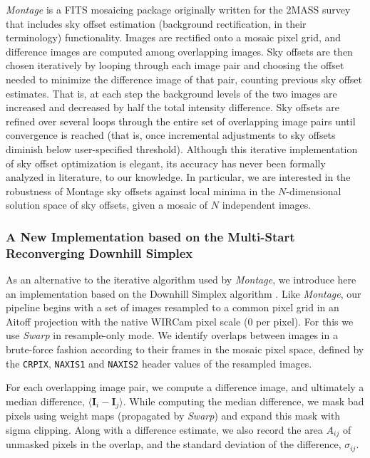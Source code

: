 \documentclass[iop]{emulateapj}
\newcommand{\vect}[1]{\boldsymbol{#1}} %
\newcommand{\sw}[1]{\textit{#1}} %
\begin{document}
\sw{Montage} is a FITS mosaicing package \citep{Berriman:2008} originally written for the 2MASS survey that includes sky offset estimation (background rectification, in their terminology) functionality.
Images are rectified onto a mosaic pixel grid, and difference images are computed among overlapping images.
Sky offsets are then chosen iteratively by looping through each image pair and choosing the offset needed to minimize the difference image of that pair, counting previous sky offset estimates.
That is, at each step the background levels of the two images are increased and decreased by half the total intensity difference.
Sky offsets are refined over several loops through the entire set of overlapping image pairs until convergence is reached (that is, once incremental adjustments to sky offsets diminish below user-specified threshold).
Although this iterative implementation of sky offset optimization is elegant, its accuracy has never been formally analyzed in literature, to our knowledge.
In particular, we are interested in the robustness of Montage sky offsets against local minima in the $N$-dimensional solution space of sky offsets, given a mosaic of $N$ independent images.

\subsubsection{A New Implementation based on the Multi-Start Reconverging Downhill Simplex}
\label{sec:msrnm_algo}

As an alternative to the iterative algorithm used by \sw{Montage}, we introduce here an implementation based on the Downhill Simplex algorithm \cite[][hereafter, NM]{Nelder:1965}.
Like \sw{Montage}, our pipeline begins with a set of images resampled to a common pixel grid in an Aitoff projection with the native WIRCam pixel scale (0 per pixel).
For this we use \sw{Swarp} in resample-only mode.
We identify overlaps between images in a brute-force fashion according to their frames in the mosaic pixel space, defined by the \texttt{CRPIX}, \texttt{NAXIS1} and \texttt{NAXIS2} header values of the resampled images.

For each overlapping image pair, we compute a difference image, and ultimately a median difference, $\langle \vect{I}_i - \vect{I}_j \rangle$.
While computing the median difference, we mask bad pixels using weight maps (propagated by \sw{Swarp}) and expand this mask with sigma clipping.
Along with a difference estimate, we also record the area $A_{ij}$ of unmasked pixels in the overlap, and the standard deviation of the difference, $\sigma_{ij}$.
\end{document}
